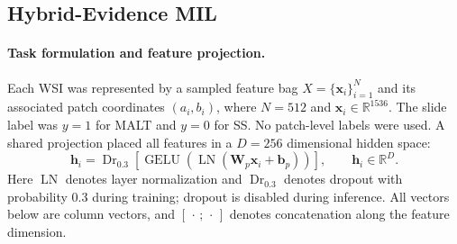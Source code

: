 \subsection{Hybrid-Evidence MIL}

\paragraph{Task formulation and feature projection.}
Each WSI was represented by a sampled feature bag
$X=\{\mathbf{x}_i\}_{i=1}^{N}$ and its associated patch coordinates
$(a_i,b_i)$, where $N=512$ and $\mathbf{x}_i\in\mathbb{R}^{1536}$.
The slide label was $y=1$ for MALT and $y=0$ for SS.
No patch-level labels were used. A shared projection placed all features in a
$D=256$ dimensional hidden space:
\begin{equation}\label{eq:projection}
 \mathbf{h}_i = \operatorname{Dr}_{0.3}\!\left[
  \operatorname{GELU}\!\left(\operatorname{LN}
  (\mathbf{W}_{p}\mathbf{x}_i+\mathbf{b}_{p})\right)\right],
 \qquad \mathbf{h}_i\in\mathbb{R}^{D}.
\end{equation}
Here $\operatorname{LN}$ denotes layer normalization and $\operatorname{Dr}_{0.3}$
denotes dropout with probability 0.3 during training; dropout is disabled during
inference. All vectors below are column vectors, and $[\,\cdot\,;\,\cdot\,]$
denotes concatenation along the feature dimension.

